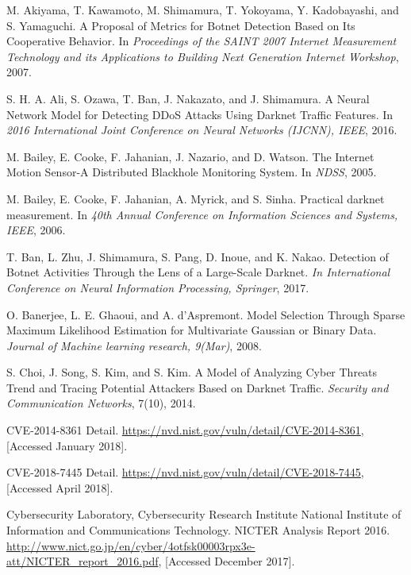 \documentclass[letterpaper]{sig-alternate-10pt}
\begin{document}
\begin{thebibliography}{100}

M. Akiyama, T. Kawamoto, M. Shimamura, T. Yokoyama, Y. Kadobayashi, and S. Yamaguchi. A Proposal of Metrics for Botnet Detection Based on Its Cooperative Behavior. In {\it Proceedings of the SAINT 2007 Internet Measurement Technology and its Applications to Building Next Generation Internet Workshop}, 2007.

S. H. A. Ali, S. Ozawa, T. Ban, J. Nakazato, and J. Shimamura. A Neural Network Model for Detecting DDoS Attacks Using Darknet Traffic Features. In {\it 2016 International Joint Conference on Neural Networks (IJCNN), IEEE}, 2016.

M. Bailey, E. Cooke, F. Jahanian, J. Nazario, and D. Watson. The Internet Motion Sensor-A Distributed Blackhole Monitoring System. In {\it NDSS}, 2005.

M. Bailey, E. Cooke, F. Jahanian, A. Myrick, and S. Sinha. Practical darknet measurement. In {\it 40th Annual Conference on Information Sciences and Systems, IEEE}, 2006.

T. Ban, L. Zhu, J. Shimamura, S. Pang, D. Inoue, and K. Nakao. Detection of Botnet Activities Through the Lens of a Large-Scale Darknet. {\it In International Conference on Neural Information Processing, Springer}, 2017.

O. Banerjee, L. E. Ghaoui, and A. d'Aspremont. Model Selection Through Sparse Maximum Likelihood Estimation for Multivariate Gaussian or Binary Data. {\it Journal of Machine learning research, 9(Mar)}, 2008.

S. Choi, J. Song, S. Kim, and S. Kim. A Model of Analyzing Cyber Threats Trend and Tracing Potential Attackers Based on Darknet Traffic. {\it Security and Communication Networks}, 7(10), 2014.

CVE-2014-8361 Detail. \url{https://nvd.nist.gov/vuln/detail/CVE-2014-8361}, [Accessed January 2018].

CVE-2018-7445 Detail. \url{https://nvd.nist.gov/vuln/detail/CVE-2018-7445}, [Accessed April 2018].

Cybersecurity Laboratory, Cybersecurity Research Institute
National Institute of Information and Communications Technology. NICTER Analysis Report 2016. \url{http://www.nict.go.jp/en/cyber/4otfsk00003rpx3e-att/NICTER_report_2016.pdf}, [Accessed December 2017].


\end{thebibliography}
\end{document}
